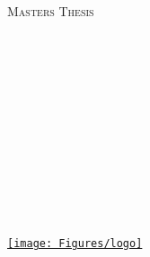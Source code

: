 \documentclass[
12pt, %
english, %
onehalfspacing, %
rnolistspacing, %
parskip, %
headsepline, %
chapterinoneline, %
]{MastersDoctoralThesis} %
\author{Morten \textsc{Mjelva}} %
\numberwithin{figure}{chapter}
\numberwithin{table}{chapter}
\begin{document}
\frontmatter %

\pagestyle{plain} %


\begin{titlepage}
\begin{center}

\vspace*{.06\textheight}
{\scshape\Large \univname\par}\vspace{1.5cm} %
\textsc{\Large Masters Thesis}\\[0.5cm] %

\HRule \\[0.4cm] %
{\huge \bfseries \ttitle\par}\vspace{0.4cm} %
\HRule \\[1.5cm] %

\begin{minipage}[t]{0.4\textwidth}
\begin{flushleft} \large
{}\\
\href{http://www.linkedin.com/in/mortenmjelva}{\authorname} %
\end{flushleft}
\end{minipage}
\begin{minipage}[t]{0.4\textwidth}
\begin{flushright} \large
{} \\
\href{http://www.ntnu.edu/employees/sverre.hendseth}{\supname} %
\end{flushright}
\end{minipage}\\[2.6cm]

\vfill

\large {}\\[0.3cm] %
\\[0.4cm]
\deptname\\[2.6cm] %

\vfill

\href{http://www.ntnu.edu}{\texttt{[image: Figures/logo]}} %

\vfill
\end{center}
\end{titlepage}
\end{document}
